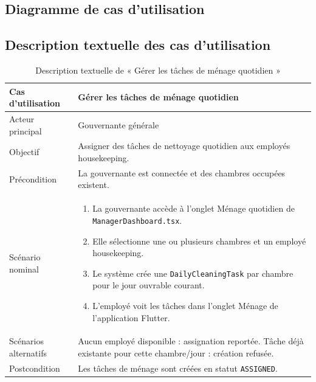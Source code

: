 \subsection{Diagramme de cas d'utilisation}

\subsection{Description textuelle des cas d'utilisation}

\begin{table}[H]
\centering
\caption{Description textuelle de « Gérer les tâches de ménage quotidien »}
\small
\begin{tabularx}{\textwidth}{|p{3.5cm}|X|}
\hline
Cas d'utilisation & Gérer les tâches de ménage quotidien \\ \hline
Acteur principal & Gouvernante générale \\ \hline
Objectif & Assigner des tâches de nettoyage quotidien aux employés housekeeping. \\ \hline
Précondition & La gouvernante est connectée et des chambres occupées existent. \\ \hline
Scénario nominal &
\begin{enumerate}[nosep]
\item La gouvernante accède à l'onglet Ménage quotidien de \texttt{ManagerDashboard.tsx}.
\item Elle sélectionne une ou plusieurs chambres et un employé housekeeping.
\item Le système crée une \texttt{DailyCleaningTask} par chambre pour le jour ouvrable courant.
\item L'employé voit les tâches dans l'onglet Ménage de l'application Flutter.
\end{enumerate} \\ \hline
Scénarios alternatifs & Aucun employé disponible : assignation reportée. Tâche déjà existante pour cette chambre/jour : création refusée. \\ \hline
Postcondition & Les tâches de ménage sont créées en statut \texttt{ASSIGNED}. \\ \hline
\end{tabularx}
\end{table}

